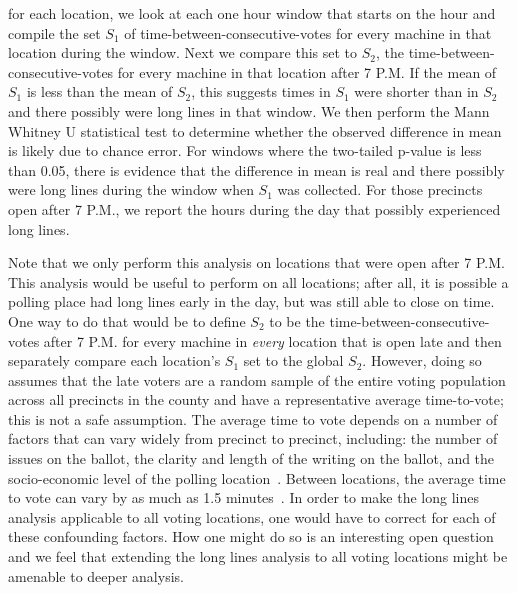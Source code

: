 \documentclass[letterpaper,twocolumn,10pt]{article}
\begin{document}
for each location, we look at each one hour window that starts on the hour and
compile the set $S_1$ of time-between-consecutive-votes for every machine in
that location during the window. Next we compare this set to $S_2$, the
time-between-consecutive-votes for every machine in that location after 7
P.M. If the mean of $S_1$ is less than the mean of $S_2$, this suggests times in
$S_1$ were shorter than in $S_2$ and there possibly were long lines in that
window. We then perform the Mann Whitney U statistical test to determine whether
the observed difference in mean is likely due to chance error. For windows where the
two-tailed p-value is less than 0.05, there is evidence that the difference in
mean is real and there possibly were long lines during the window when $S_1$ was
collected. For those precincts open after 7 P.M., we report the hours during the
day that possibly experienced long lines.

Note that we only perform this analysis on locations that were open
after 7 P.M. This analysis would be useful to perform on all locations; after all, it is possible a polling place had long lines early in the day, but
was still able to close on time. One way to do that would be to define $S_2$ to
be the time-between-consecutive-votes after 7 P.M. for every machine in
\emph{every} location that is open late and then separately compare each location's $S_1$
set to the global $S_2$. However, doing so assumes that
the late voters are a random sample of the entire voting population across all
precincts in the county and have a representative average time-to-vote; this is
not a safe assumption. The average time to vote depends on a number of factors
that can vary widely from precinct to precinct, including: the number of issues
on the ballot, the clarity and length of the writing on the ballot, and the
socio-economic level of the polling location~\cite{Spencer2010,
  Allen2006}. Between locations, the average time to vote can vary by as much as
1.5 minutes~\cite{Spencer2010}. In order to make the long lines analysis
applicable to all voting locations, one would have to correct for each
of these confounding factors. How one might do so is an interesting open
question and we feel that extending the long lines analysis to all voting locations
might be amenable to deeper analysis.

\end{document}
